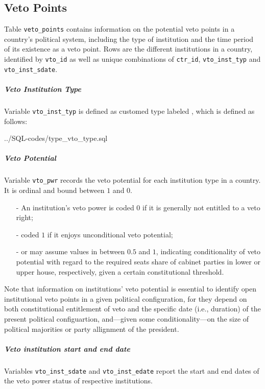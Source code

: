 \subsection{Veto Points}\label{subsec_tab_veto_points}
Table \texttt{\footnotesize veto\_points} contains information on the potential veto points in a country’s political system, including the type of institution and the time period of its existence as a veto point. 
Rows are the different institutions in a country, identified by  \texttt{\footnotesize vto\_id} as well as unique combinations of \texttt{\footnotesize ctr\_id}, \texttt{\footnotesize vto\_inst\_typ} and \texttt{\footnotesize vto\_inst\_sdate}.

\subparagraph{Veto Institution Type}
Variable \texttt{\footnotesize vto\_inst\_typ} is defined as customed type labeled , which is defined as follows:

%
{../SQL-codes/type_vto_type.sql}

\subparagraph{Veto Potential}
Variable \texttt{\footnotesize vto\_pwr} records the veto potential for each institution type in a country. It is  ordinal and bound between $1$ and $0$. 
\begin{itemize}\itemsep-4pt 
\item[-] An institution's veto power is coded $0$ if it is generally not entitled to a veto right; 
\item[-] coded $1$ if it enjoys unconditional veto potential; 
\item[-] or may assume values in between $0.5$ and $1$, indicating conditionality of veto potential with regard to the required seats share of cabinet parties in lower or upper house, respectively, given a certain constitutional threshold.
\end{itemize}

Note that information on institutions' veto potential is essential to identify open institutional veto points in a given political configuration, for they depend on both constitutional entitlement of veto and the specific date (i.e., duration) of the present political configuartion, and---given some conditionality---on the size of political majorities or party allignment of the president.

\subparagraph{Veto institution start and end date}
Variables \texttt{\footnotesize vto\_inst\_sdate} and \texttt{\footnotesize vto\_inst\_edate} report the start and end dates of the veto power status of respective institutions.

